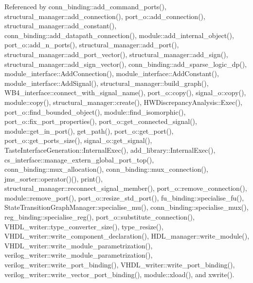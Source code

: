 Referenced by conn\+\_\+binding\+::add\+\_\+command\+\_\+ports(), structural\+\_\+manager\+::add\+\_\+connection(), port\+\_\+o\+::add\+\_\+connection(), structural\+\_\+manager\+::add\+\_\+constant(), conn\+\_\+binding\+::add\+\_\+datapath\+\_\+connection(), module\+::add\+\_\+internal\+\_\+object(), port\+\_\+o\+::add\+\_\+n\+\_\+ports(), structural\+\_\+manager\+::add\+\_\+port(), structural\+\_\+manager\+::add\+\_\+port\+\_\+vector(), structural\+\_\+manager\+::add\+\_\+sign(), structural\+\_\+manager\+::add\+\_\+sign\+\_\+vector(), conn\+\_\+binding\+::add\+\_\+sparse\+\_\+logic\+\_\+dp(), module\+\_\+interface\+::\+Add\+Connection(), module\+\_\+interface\+::\+Add\+Constant(), module\+\_\+interface\+::\+Add\+Signal(), structural\+\_\+manager\+::build\+\_\+graph(), W\+B4\+\_\+interface\+::connect\+\_\+with\+\_\+signal\+\_\+name(), port\+\_\+o\+::copy(), signal\+\_\+o\+::copy(), module\+::copy(), structural\+\_\+manager\+::create(), H\+W\+Discrepancy\+Analysis\+::\+Exec(), port\+\_\+o\+::find\+\_\+bounded\+\_\+object(), module\+::find\+\_\+isomorphic(), port\+\_\+o\+::fix\+\_\+port\+\_\+properties(), port\+\_\+o\+::get\+\_\+connected\+\_\+signal(), module\+::get\+\_\+in\+\_\+port(), get\+\_\+path(), port\+\_\+o\+::get\+\_\+port(), port\+\_\+o\+::get\+\_\+ports\+\_\+size(), signal\+\_\+o\+::get\+\_\+signal(), Taste\+Interface\+Generation\+::\+Internal\+Exec(), add\+\_\+library\+::\+Internal\+Exec(), cs\+\_\+interface\+::manage\+\_\+extern\+\_\+global\+\_\+port\+\_\+top(), conn\+\_\+binding\+::mux\+\_\+allocation(), conn\+\_\+binding\+::mux\+\_\+connection(), jms\+\_\+sorter\+::operator()(), print(), structural\+\_\+manager\+::reconnect\+\_\+signal\+\_\+member(), port\+\_\+o\+::remove\+\_\+connection(), module\+::remove\+\_\+port(), port\+\_\+o\+::resize\+\_\+std\+\_\+port(), fu\+\_\+binding\+::specialise\+\_\+fu(), State\+Transition\+Graph\+Manager\+::specialise\+\_\+mu(), conn\+\_\+binding\+::specialise\+\_\+mux(), reg\+\_\+binding\+::specialise\+\_\+reg(), port\+\_\+o\+::substitute\+\_\+connection(), V\+H\+D\+L\+\_\+writer\+::type\+\_\+converter\+\_\+size(), type\+\_\+resize(), V\+H\+D\+L\+\_\+writer\+::write\+\_\+component\+\_\+declaration(), H\+D\+L\+\_\+manager\+::write\+\_\+module(), V\+H\+D\+L\+\_\+writer\+::write\+\_\+module\+\_\+parametrization(), verilog\+\_\+writer\+::write\+\_\+module\+\_\+parametrization(), verilog\+\_\+writer\+::write\+\_\+port\+\_\+binding(), V\+H\+D\+L\+\_\+writer\+::write\+\_\+port\+\_\+binding(), verilog\+\_\+writer\+::write\+\_\+vector\+\_\+port\+\_\+binding(), module\+::xload(), and xwrite().

